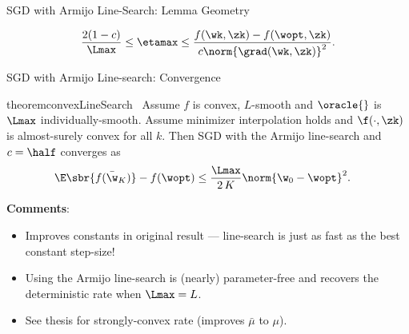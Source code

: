 \documentclass[mathserif,notheorems, hyperref={colorlinks, citecolor=blue, urlcolor=blue, linkcolor=blue}]{beamer}
\begin{document}
    \begin{frame}{SGD with Armijo Line-Search: Lemma Geometry}
        \Large

        \[  \frac{2 (1-c)}{\Lmax} \leq \etamax \leq \frac{f(\wk, \zk) - f(\wopt, \zk)}{c \norm{\grad(\wk, \zk)}^2}. \] 

        \vspace{1ex} 

        \begin{figure}[]
            \centering
            
        \end{figure} 

    \end{frame}

    \begin{frame}{SGD with Armijo Line-search: Convergence}
        \begin{restatable}{theorem}{convexLineSearch}~\label{thm:convex-line-search}
            Assume \( f \) is convex, \( L \)-smooth and \( \oracle{} \) is \( \Lmax \) individually-smooth.
            Assume minimizer interpolation holds and \( \f(\cdot, \zk) \) is almost-surely convex for all \( k \).
            Then SGD with the Armijo line-search and \( c = \half \) converges as 
            \begin{align*}
                \E\sbr{f(\bar \w_K)} - f(\wopt) &\leq \frac{\Lmax}{2 \, K} \norm{\w_0 - \wopt}^2.
            \end{align*} 
        \end{restatable}
        
        \textbf{Comments}:
        \begin{itemize}
            \item Improves constants in original result \citep{vaswani2019painless} ---
            line-search is just as fast as the best constant step-size! 
            \item Using the Armijo line-search is (nearly) parameter-free and recovers the deterministic rate when \( \Lmax = L \). 
            \item See thesis for strongly-convex rate (improves \( \bar \mu \) to \( \mu \)). 
        \end{itemize}

    \end{frame}
\end{document}
